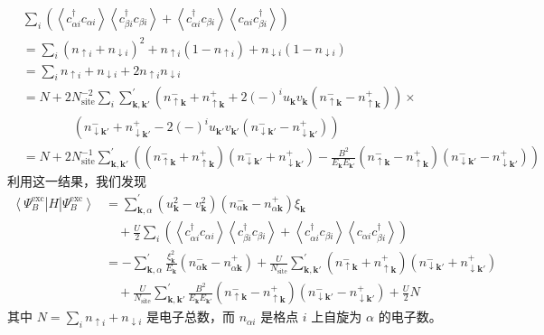 \begin{align*}
&\sum_{i}\left(\left\langle c^{\dagger}_{\alpha i}c_{\alpha i}\right\rangle \left\langle c^{\dagger}_{\beta i}c_{\beta i}\right\rangle + \left\langle c^{\dagger}_{\alpha i}c_{\beta i}\right\rangle \left\langle c_{\alpha i}c^{\dagger}_{\beta i}\right\rangle\right)\\
&=\sum_{i}\left(n_{\uparrow i}+n_{\downarrow i}\right)^{2}+n_{\uparrow i}\left(1-n_{\uparrow i}\right)+n_{\downarrow i}\left(1-n_{\downarrow i}\right)\\
&=\sum_{i}n_{\uparrow i}+n_{\downarrow i}+2n_{\uparrow i}n_{\downarrow i}\\
&=N+2N^{-2}_{\mathrm{site}}\sum_{i}\sum^{\prime}_{\pmb{k},\pmb{k}'}\left(n^{-}_{\uparrow\pmb{k}}+n^{+}_{\uparrow\pmb{k}}+2(-)^{i}u_{\pmb{k}}v_{\pmb{k}}\left(n^{-}_{\uparrow\pmb{k}}-n^{+}_{\uparrow\pmb{k}}\right)\right)\times\\
&\qquad\qquad \left(n^{-}_{\downarrow\pmb{k}'}+n^{+}_{\downarrow\pmb{k}'}-2(-)^{i}u_{\pmb{k}'}v_{\pmb{k}'}\left(n^{-}_{\downarrow\pmb{k}'}-n^{+}_{\downarrow\pmb{k}'}\right)\right)\\
&=N+2N^{-1}_{\mathrm{site}}\sum^{\prime}_{\pmb{k},\pmb{k}'}\left(\left(n^{-}_{\uparrow\pmb{k}}+n^{+}_{\uparrow\pmb{k}}\right)\left(n^{-}_{\downarrow\pmb{k}'}+n^{+}_{\downarrow\pmb{k}'}\right)-\frac{B^{2}}{E_{\pmb{k}}E_{\pmb{k}'}}\left(n^{-}_{\uparrow\pmb{k}}-n^{+}_{\uparrow\pmb{k}}\right)\left(n^{-}_{\downarrow\pmb{k}'}-n^{+}_{\downarrow\pmb{k}'}\right)\right)
\end{align*}
利用这一结果，我们发现
\begin{align*}
\left\langle \Psi^{\mathrm{exc}}_{B}\right|H\left|\Psi^{\mathrm{exc}}_{B}\right\rangle&=\sum^{\prime}_{\pmb{k},\alpha}\left(u^{2}_{\pmb{k}}-v^{2}_{\pmb{k}}\right)\left(n^{-}_{\alpha\pmb{k}}-n^{+}_{\alpha\pmb{k}}\right)\xi_{\pmb{k}} \tag{5.5.6}\\
&\quad+\frac{U}{2}\sum_{i}\left(\left\langle c^{\dagger}_{\alpha i}c_{\alpha i}\right\rangle \left\langle c^{\dagger}_{\beta i}c_{\beta i}\right\rangle + \left\langle c^{\dagger}_{\alpha i}c_{\beta i}\right\rangle \left\langle c_{\alpha i}c^{\dagger}_{\beta i}\right\rangle\right)\\
&=-\sum^{\prime}_{\pmb{k},\alpha}\frac{\xi^{2}_{\pmb{k}}}{E_{\pmb{k}}}\left(n^{-}_{\alpha\pmb{k}}-n^{+}_{\alpha\pmb{k}}\right)+\frac{U}{N_{\mathrm{site}}}\sum^{\prime}_{\pmb{k},\pmb{k}'}\left(n^{-}_{\uparrow\pmb{k}}+n^{+}_{\uparrow\pmb{k}}\right)\left(n^{-}_{\downarrow\pmb{k}'}+n^{+}_{\downarrow\pmb{k}'}\right)\\
&\quad+\frac{U}{N_{\mathrm{site}}}\sum^{\prime}_{\pmb{k},\pmb{k}'}\frac{B^{2}}{E_{\pmb{k}}E_{\pmb{k}'}}\left(n^{-}_{\uparrow\pmb{k}}-n^{+}_{\uparrow\pmb{k}}\right)\left(n^{-}_{\downarrow\pmb{k}'}-n^{+}_{\downarrow\pmb{k}'}\right)+\frac{U}{2}N
\end{align*}
其中 $N=\sum_{i}n_{\uparrow i}+n_{\downarrow i}$ 是电子总数，而 $n_{\alpha i}$ 是格点 $i$ 上自旋为 $\alpha$ 的电子数。

